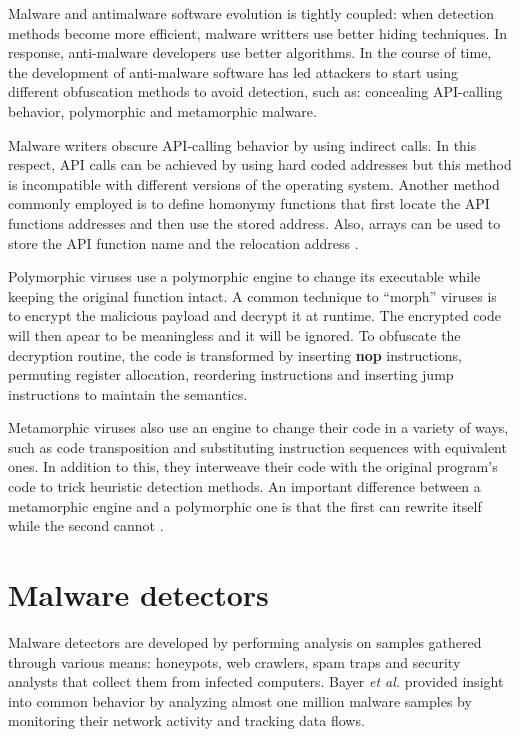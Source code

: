 Malware and antimalware software evolution is tightly coupled: when detection methods become more efficient, malware writters use better hiding techniques. In response, anti-malware developers use better algorithms. In the course of time, the development of anti-malware software has led attackers to start using different obfuscation methods to avoid detection, such as: concealing API-calling behavior, polymorphic and metamorphic malware.

Malware writers obscure API-calling behavior by using indirect calls. In this respect, API calls can be achieved by using hard coded addresses but this method is incompatible with different versions of the operating system. Another method commonly employed is to define homonymy functions that first locate the API functions addresses and then use the stored address. Also, arrays can be used to store the API function name and the relocation address \cite{static-detection-behavior}.

Polymorphic viruses use a polymorphic engine to change its executable while keeping the original function intact. A common technique to ``morph'' viruses is to encrypt the malicious payload and decrypt it at runtime. The encrypted code will then apear to be meaningless and it will be ignored. To obfuscate the decryption routine, the code is transformed by inserting \textbf{nop} instructions, permuting register allocation, reordering instructions and inserting jump instructions to maintain the semantics.

Metamorphic viruses also use an engine to change their code in a variety of ways, such as code transposition and substituting instruction sequences with equivalent ones. In addition to this, they interweave their code with the original program's code to trick heuristic detection methods. An important difference between a metamorphic engine and a polymorphic one is that the first can rewrite itself while the second cannot \cite{testing-mal-det}.

\section{Malware detectors}
\label{sec:mal-detectors}

Malware detectors are developed by performing analysis on samples gathered through various means: honeypots, web crawlers, spam traps and security analysts that collect them from infected computers. Bayer \textit{et al.} \cite{current-mal-behavior} provided insight into common behavior by analyzing almost one million malware samples by monitoring their network activity and tracking data flows.

